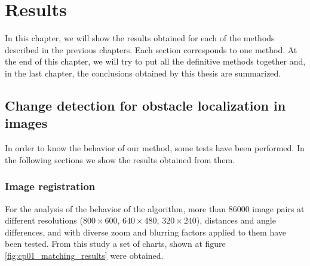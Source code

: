 

\chapter{Results}\label{ch:chapter08}

In this chapter, we will show the results obtained for each of the methods described in the previous chapters. Each section corresponds to one method. At the end of this chapter, we will try to put all the definitive methods together and, in the last chapter, the conclusions obtained by this thesis are summarized.

\graphicspath{{./images/chapter01/bmps/}{./images/chapter01/vects/}{./images/chapter01/}}
\section{Change detection for obstacle localization in images}\label{ch:chapter01_02}

In order to know the behavior of our method, some tests have been performed. In the following sections we show the results obtained from them.

\subsection{Image registration}\label{ch:chapter01_02_01}

For the analysis of the behavior of the algorithm, more than 86000 image pairs at different resolutions ($800 \times 600$, $640 \times 480$, $320 \times 240$), distances and angle differences, and with diverse zoom and blurring factors applied to them have been tested. From this study a set of charts, shown at figure \ref{fig:cp01_matching_results} were obtained.

